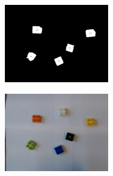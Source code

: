 \begin{figure}[H]
    \includegraphics[width=0.4\textwidth]{figures/centroids.png}
    \caption{}
    \label{fig:centroids}
\end{figure}

\begin{figure}[H]
    \includegraphics[width=0.4\textwidth]{figures/centroids_colour.png}
    \caption{}
    \label{fig:centroids_colour}
\end{figure}


